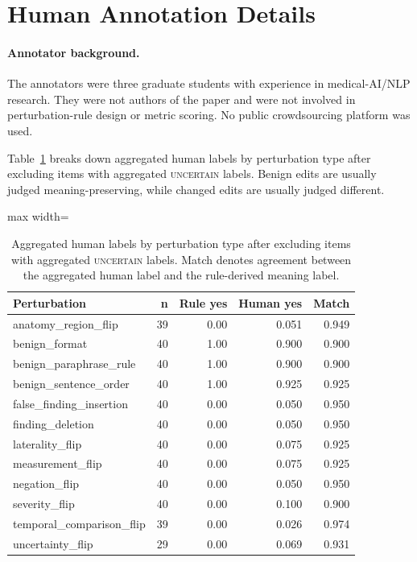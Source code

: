 \documentclass[11pt]{article}
\newcommand{\uncertain}{\textsc{uncertain}\xspace}
\begin{document}
\section{Human Annotation Details}
\label{app:human}

\paragraph{Annotator background.}
The annotators were three graduate students with experience in medical-AI/NLP research. 
They were not authors of the paper and were not involved in perturbation-rule design or metric scoring.
No public crowdsourcing platform was used.

Table~\ref{tab:annotation-by-type} breaks down aggregated human labels by perturbation type after excluding items with aggregated \uncertain labels. 
Benign edits are usually judged meaning-preserving, while changed edits are usually judged different.

\begin{table}[H]
\centering
\scriptsize
\setlength{\tabcolsep}{2pt}
\begin{adjustbox}{max width=\columnwidth}
\begin{tabular}{lrrrr}
\toprule
\textbf{Perturbation} & \textbf{n} & \textbf{Rule yes} & \textbf{Human yes} & \textbf{Match} \\
\midrule
anatomy\_region\_flip & 39 & 0.00 & 0.051 & 0.949 \\
benign\_format & 40 & 1.00 & 0.900 & 0.900 \\
benign\_paraphrase\_rule & 40 & 1.00 & 0.900 & 0.900 \\
benign\_sentence\_order & 40 & 1.00 & 0.925 & 0.925 \\
false\_finding\_insertion & 40 & 0.00 & 0.050 & 0.950 \\
finding\_deletion & 40 & 0.00 & 0.050 & 0.950 \\
laterality\_flip & 40 & 0.00 & 0.075 & 0.925 \\
measurement\_flip & 40 & 0.00 & 0.075 & 0.925 \\
negation\_flip & 40 & 0.00 & 0.050 & 0.950 \\
severity\_flip & 40 & 0.00 & 0.100 & 0.900 \\
temporal\_comparison\_flip & 39 & 0.00 & 0.026 & 0.974 \\
uncertainty\_flip & 29 & 0.00 & 0.069 & 0.931 \\
\bottomrule
\end{tabular}
\end{adjustbox}
\caption{Aggregated human labels by perturbation type after excluding items with aggregated \uncertain labels. Match denotes agreement between the aggregated human label and the rule-derived meaning label.}
\label{tab:annotation-by-type}
\end{table}
\end{document}
